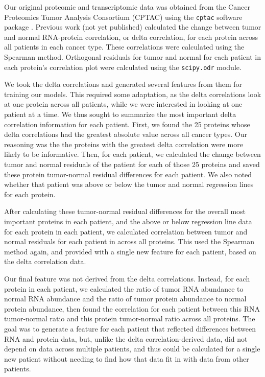 \documentclass{article}
\begin{document}
Our original proteomic and transcriptomic data was obtained from the Cancer Proteomics Tumor Analysis Consortium (CPTAC) \cite{rodriguez_next_2021} using the \texttt{cptac} software package \cite{lindgren_simplified_2021}. Previous work (not yet published) calculated the change between tumor and normal RNA-protein correlation, or delta correlation, for each protein across all patients in each cancer type. These correlations were calculated using the Spearman method. Orthogonal residuals for tumor and normal for each patient in each protein's correlation plot were calculated using the \texttt{scipy.odr} module.

We took the delta correlations and generated several features from them for training our models. This required some adaptation, as the delta correlations look at one protein across all patients, while we were interested in looking at one patient at a time. We thus sought to summarize the most important delta correlation information for each patient. First, we found the 25 proteins whose delta correlations had the greatest absolute value across all cancer types. Our reasoning was the the proteins with the greatest delta correlation were more likely to be informative. Then, for each patient, we calculated the change between tumor and normal residuals of the patient for each of those 25 proteins and saved these protein tumor-normal residual differences for each patient. We also noted whether that patient was above or below the tumor and normal regression lines for each protein.

After calculating these tumor-normal residual differences for the overall most important proteins in each patient, and the above or below regression line data for each protein in each patient, we calculated correlation between tumor and normal residuals for each patient in across all proteins. This used the Spearman method again, and provided with a single new feature for each patient, based on the delta correlation data.

Our final feature was not derived from the delta correlations. Instead, for each protein in each patient, we calculated the ratio of tumor RNA abundance to normal RNA abundance and the ratio of tumor protein abundance to normal protein abundance, then found the correlation for each patient between this RNA tumor-normal ratio and this protein tumor-normal ratio across all proteins. The goal was to generate a feature for each patient that reflected differences between RNA and protein data, but, unlike the delta correlation-derived data, did not depend on data across multiple patients, and thus could be calculated for a single new patient without needing to find how that data fit in with data from other patients.
\end{document}
